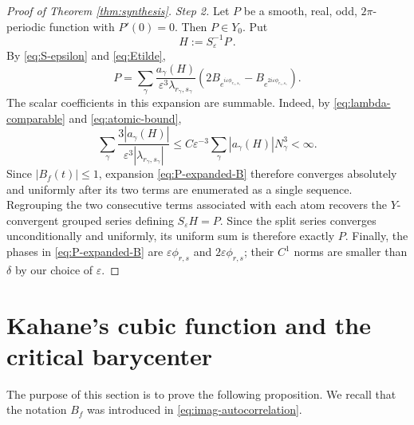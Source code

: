 \documentclass[10pt,a4paper]{amsart}
\begin{document}
\begin{proof}[Proof of Theorem \ref{thm:synthesis}]
\emph{Step 2.}
Let $P$ be a smooth, real, odd, $2\pi$-periodic function with $P'(0)=0$. Then $P\in Y_0$. Put
\[
 H:=S_\varepsilon^{-1}P \,.
\]
By \eqref{eq:S-epsilon} and \eqref{eq:Etilde},
\begin{equation}\label{eq:P-expanded-B}
 P
 =\sum_\gamma
 \frac{a_\gamma(H)}{\varepsilon^3\lambda_{r_\gamma,s_\gamma}}
 \left(2B_{e^{i\varepsilon\phi_{r_\gamma,s_\gamma}}}
 -B_{e^{2i\varepsilon\phi_{r_\gamma,s_\gamma}}}
 \right).
\end{equation}
The scalar coefficients in this expansion are summable.  Indeed, by \eqref{eq:lambda-comparable} and \eqref{eq:atomic-bound},
\begin{equation}\label{eq:coefficient-total-variation}
 \sum_\gamma
 \frac{3|a_\gamma(H)|}{\varepsilon^3|\lambda_{r_\gamma,s_\gamma}|}
 \leq C\varepsilon^{-3}
 \sum_\gamma|a_\gamma(H)|N_\gamma^3
 <\infty.
\end{equation}
Since $|B_f(t)|\leq1$, expansion \eqref{eq:P-expanded-B} therefore converges absolutely and uniformly after its two terms are enumerated as a single sequence.  Regrouping the two consecutive terms associated with each atom recovers the $Y$-convergent grouped series defining $S_\varepsilon H=P$. Since the split series converges unconditionally and uniformly, its uniform sum is therefore exactly $P$.  Finally, the phases in \eqref{eq:P-expanded-B} are $\varepsilon\phi_{r,s}$ and $2\varepsilon\phi_{r,s}$; their $C^1$ norms are smaller than $\delta$ by our choice of $\varepsilon$.
\end{proof}



\section{Kahane's cubic function and the critical barycenter}\label{sec:kahane}

The purpose of this section is to prove the following proposition. We recall that the notation $B_f$ was introduced in \eqref{eq:imag-autocorrelation}.
\end{document}

